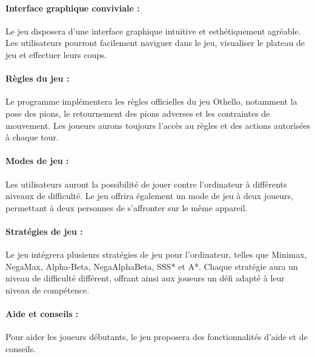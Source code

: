 \documentclass[12pt]{article}
\begin{document}
\paragraph{Interface graphique conviviale :} Le jeu disposera d'une interface graphique intuitive et esthétiquement agréable. Les utilisateurs pourront facilement naviguer dans le jeu, visualiser le plateau de jeu et effectuer leurs coups.

\paragraph{Règles du jeu :} Le programme implémentera les règles officielles du jeu Othello, notamment la pose des pions, le retournement des pions adverses et les contraintes de mouvement. Les joueurs aurons toujours l'accès au règles et des actions autorisées à chaque tour.

\paragraph{Modes de jeu :} Les utilisateurs auront la possibilité de jouer contre l'ordinateur à différents niveaux de difficulté. Le jeu offrira également un mode de jeu à deux joueurs, permettant à deux personnes de s'affronter sur le même appareil.

\paragraph{Stratégies de jeu :} Le jeu intégrera plusieurs stratégies de jeu pour l'ordinateur, telles que Minimax, NegaMax, Alpha-Beta, NegaAlphaBeta, SSS* et A*. Chaque stratégie aura un niveau de difficulté différent, offrant ainsi aux joueurs un défi adapté à leur niveau de compétence.

\paragraph{Aide et conseils :} Pour aider les joueurs débutants, le jeu proposera des fonctionnalités d'aide et de conseils.
\end{document}
